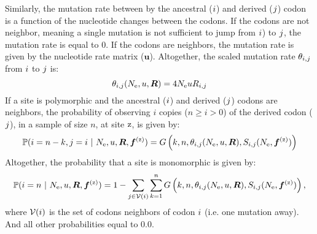 Similarly, the mutation rate between by the ancestral (${i}$) and derived (${j}$) codon is a function of the nucleotide changes between the codons. If the codons are not neighbor, meaning a single mutation is not sufficient to jump from ${i}$) to ${j}$, the mutation rate is equal to $0$. If the codons are neighbors, the mutation rate is given by the nucleotide rate matrix ($ \bm{u} $). Altogether, the scaled mutation rate $\theta_{{i}, {j}}$ from ${i}$ to ${j}$ is:
\begin{equation}
	\theta_{{i}, {j}}(N_{\text{e}}, u, \bm{R}) = 4 N_{\text{e}} u R_{{i}, {j}}
\end{equation}
If a site is polymorphic and the ancestral (${i}$) and derived (${j}$) codons are neighbors, the probability of observing $i$ copies ($n \geq i > 0$) of the derived codon (${j}$), in a sample of size $n$, at site $\text{z}$, is given by:
\begin{equation}
	\mathbb{P} ({i}=n-k,{j}=i \ |\ N_{\text{e}}, u, \bm{R}, \bm{f}^{(\text{z})}) = G\left(k, n, \theta_{{i}, {j}}(N_{\text{e}}, u, \bm{R}), S_{{i}, {j}}(N_{\text{e}}, \bm{f}^{(\text{z})}) \right)
\end{equation}
Altogether, the probability that a site is monomorphic is given by:
\begin{equation}
	\mathbb{P} ({i}= n \ |\ N_{\text{e}}, u, \bm{R}, \bm{f}^{(\text{z})}) = 1 - \sum\limits_{{j} \in \mathcal{V} ({i})} \sum\limits_{k=1}^{n} G\left(k, n, \theta_{{i}, {j}}(N_{\text{e}}, u, \bm{R}), S_{{i}, {j}}(N_{\text{e}}, \bm{f}^{(\text{z})})\right),
\end{equation}
where $ \mathcal{V} ({i})$ is the set of codons neighbors of codon ${i}$ (i.e. one mutation away).
And all other probabilities equal to $0.0$.

